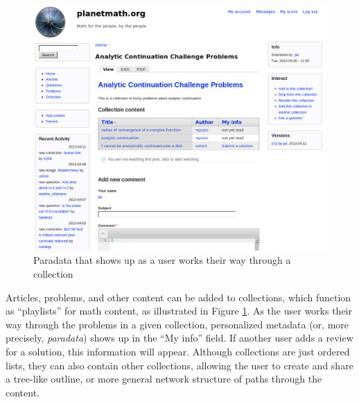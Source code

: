 \begin{vplace}[0.7]
\begin{figure}[h]
\begin{center}
\includegraphics[width=.85\textwidth]{./inputs/ProblemInCollection.png}
\end{center}
\caption{Paradata that shows up as a user works their way through a collection \label{ProblemInCollection}}
\end{figure}
\bigskip

Articles, problems, and other content can be added to collections,
which function as ``playlists'' for math content, as illustrated in
Figure \ref{ProblemInCollection}.  As the user works their way through
the problems in a given collection, personalized metadata (or, more
precisely, \emph{paradata}) shows up in the ``My info'' field.  If
another user adds a review for a solution, this information will
appear.  Although collections are just ordered lists, they can also
contain other collections, allowing the user to create and share a
tree-like outline, or more general network structure of paths through
the content.
\end{vplace}

\newpage
\FloatBarrier


